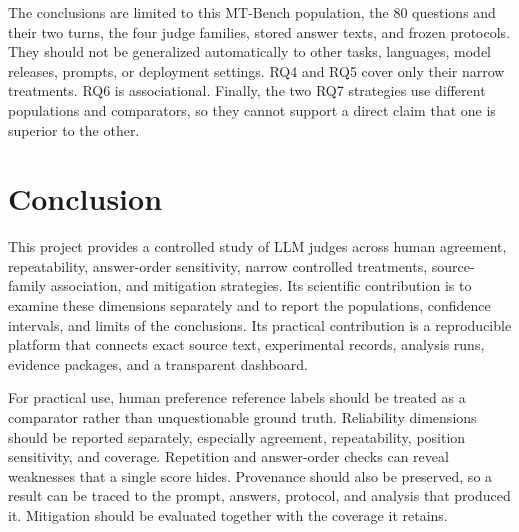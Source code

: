 \documentclass[11pt,a4paper]{article}
\begin{document}
The conclusions are limited to this MT-Bench population, the 80 questions and their two turns, the four judge families, stored answer texts, and frozen protocols. They should not be generalized automatically to other tasks, languages, model releases, prompts, or deployment settings. RQ4 and RQ5 cover only their narrow treatments. RQ6 is associational. Finally, the two RQ7 strategies use different populations and comparators, so they cannot support a direct claim that one is superior to the other.

\section{Conclusion}

This project provides a controlled study of LLM judges across human agreement, repeatability, answer-order sensitivity, narrow controlled treatments, source-family association, and mitigation strategies. Its scientific contribution is to examine these dimensions separately and to report the populations, confidence intervals, and limits of the conclusions. Its practical contribution is a reproducible platform that connects exact source text, experimental records, analysis runs, evidence packages, and a transparent dashboard.

For practical use, human preference reference labels should be treated as a comparator rather than unquestionable ground truth. Reliability dimensions should be reported separately, especially agreement, repeatability, position sensitivity, and coverage. Repetition and answer-order checks can reveal weaknesses that a single score hides. Provenance should also be preserved, so a result can be traced to the prompt, answers, protocol, and analysis that produced it. Mitigation should be evaluated together with the coverage it retains.



\end{document}
